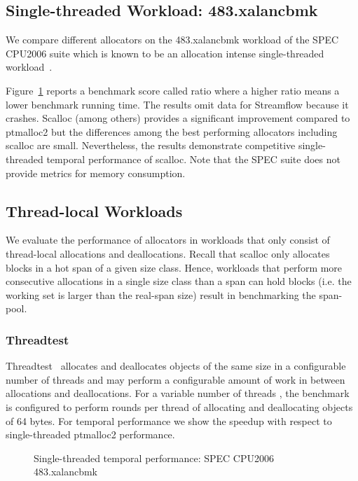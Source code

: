 \documentclass[10pt]{sigplanconf}
\newcommand{\ourSubcaption}[1]{\vspace{-\medskipamount}\caption{#1}\vspace{-\medskipamount}}
\newcommand{\placeSinglePlot}[2]{\resizebox{\columnwidth}{!}{\graphicspath{{#1}}}}
\begin{document}
\subsection{Single-threaded Workload: 483.xalancbmk}

We compare different allocators on the 483.xalancbmk workload of the SPEC
CPU2006 suite which is known to be an allocation intense single-threaded
workload~\cite{Serebryany:USENIX12}.

Figure~\ref{fig:xalan} reports a benchmark score called ratio where a higher
ratio means a lower benchmark running time. The results omit data for Streamflow
because it crashes. Scalloc (among others) provides a significant improvement
compared to ptmalloc2 but the differences among the best performing allocators
including scalloc are small. Nevertheless, the results demonstrate competitive
single-threaded temporal performance of scalloc. Note that the SPEC suite does
not provide metrics for memory consumption.



\subsection{Thread-local Workloads}\label{sec:thread-local-workloads}

We evaluate the performance of allocators in workloads that only consist of
thread-local allocations and deallocations. Recall that scalloc only allocates
blocks in a hot span of a given size class. Hence, workloads that perform more
consecutive allocations in a single size class than a span can hold blocks (i.e. the
working set is larger than the real-span size) result in benchmarking the span-pool.

\subsubsection*{Threadtest}

Threadtest~\cite{Berger:ASPLOS00} allocates and deallocates objects of the same
size in a configurable number of threads and may perform a configurable amount
of work in between allocations and deallocations. For a variable number of
threads , the benchmark is configured to perform  rounds per thread of
allocating and deallocating  objects of 64 bytes. For temporal
performance we show the speedup with respect to single-threaded ptmalloc2
performance.



\begin{figure}[t]
  \centering
  \placeSinglePlot{./fig/xalancbmk/}{fig/xalancbmk/ratio.tex}
  \ourSubcaption{Single-threaded temporal performance: SPEC CPU2006 
              483.xalancbmk}
  \label{fig:xalan}
\end{figure}
\end{document}
